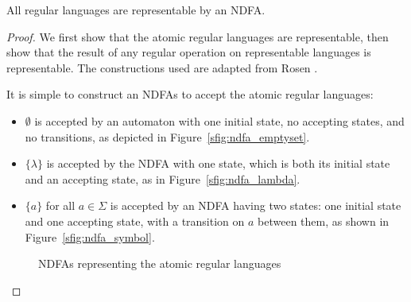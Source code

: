 \documentclass{bcthesis}
\newcommand{\footcite}[2]{\xspace\cite[pg.~{#2}]{#1}\xspace}
\begin{document}
	\begin{claim}
	\label{prop:regular_languages_representable}
		All regular languages are representable by an NDFA.
	\end{claim}
	\begin{proof}
		We first show that the atomic regular languages are representable, then show that the result of any regular operation on representable languages is representable. The constructions used are adapted from Rosen \footcite{rosen}{880--881}.

		It is simple to construct an NDFAs to accept the atomic regular languages:
		\begin{itemize}
			\item [] $\emptyset$ is accepted by an automaton with one initial state, no accepting states, and no transitions, as depicted in Figure~\ref{sfig:ndfa_emptyset}.
			\item [] $\{ \lambda \}$ is accepted by the NDFA with one state, which is both its initial state and an accepting state, as in Figure~\ref{sfig:ndfa_lambda}.
			\item [] $\{ a \}$ for all $a \in \Sigma$ is accepted by an NDFA having two states: one initial state and one accepting state, with a transition on $a$ between them, as shown in Figure~\ref{sfig:ndfa_symbol}.
		\end{itemize}


		\begin{figure}[H]
			\centering
			\setlength{\fboxrule}{0 pt}
			\caption{NDFAs representing the atomic regular languages}
			\label{fig:ndfa_atomic_regular_languages}
		\end{figure}


\end{proof}
\end{document}
